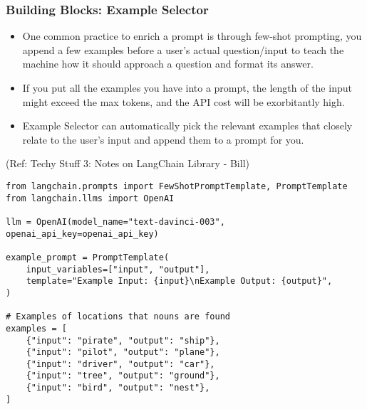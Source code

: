 \begin{frame}[fragile]\frametitle{Building Blocks: Example Selector}

\begin{itemize}
\item One common practice to enrich a prompt is through few-shot prompting, you append a few examples before a user’s actual question/input to teach the machine how it should approach a question and format its answer.
\item If you put all the examples you have into a prompt, the length of the input might exceed the max tokens, and the API cost will be exorbitantly high.
\item Example Selector can automatically pick the relevant examples that closely relate to the user’s input and append them to a prompt for you.
\end{itemize}

{\tiny (Ref: Techy Stuff 3: Notes on LangChain Library - Bill)}

\begin{lstlisting}
from langchain.prompts import FewShotPromptTemplate, PromptTemplate
from langchain.llms import OpenAI

llm = OpenAI(model_name="text-davinci-003", openai_api_key=openai_api_key)

example_prompt = PromptTemplate(
    input_variables=["input", "output"],
    template="Example Input: {input}\nExample Output: {output}",
)

# Examples of locations that nouns are found
examples = [
    {"input": "pirate", "output": "ship"},
    {"input": "pilot", "output": "plane"},
    {"input": "driver", "output": "car"},
    {"input": "tree", "output": "ground"},
    {"input": "bird", "output": "nest"},
]
\end{lstlisting}	  
\end{frame}

